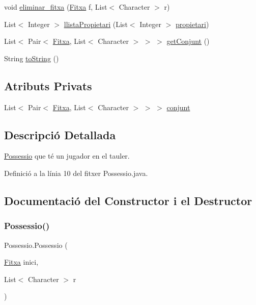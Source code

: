 \begin{DoxyCompactItemize}
\item 
void \mbox{\hyperlink{class_possessio_a2908495ca9acf15fb6c789e753a0eec8}{eliminar\+\_\+fitxa}} (\mbox{\hyperlink{class_fitxa}{Fitxa}} f, List$<$ Character $>$ r)
\item 
List$<$ Integer $>$ \mbox{\hyperlink{class_possessio_a9173269f71b9ac357c33e571f04c84c6}{llista\+Propietari}} (List$<$ Integer $>$ \mbox{\hyperlink{class_possessio_a514ceb05b8016e230eddbc7e3e43b325}{propietari}})
\item 
List$<$ Pair$<$ \mbox{\hyperlink{class_fitxa}{Fitxa}}, List$<$ Character $>$ $>$ $>$ \mbox{\hyperlink{class_possessio_a2e484840944b6f2c5a1fbe7219d39b9c}{get\+Conjunt}} ()
\item 
String \mbox{\hyperlink{class_possessio_a7e75c5f8c1bfa87d1f22049f1109f855}{to\+String}} ()
\end{DoxyCompactItemize}
\subsection*{Atributs Privats}
\begin{DoxyCompactItemize}
\item 
List$<$ Pair$<$ \mbox{\hyperlink{class_fitxa}{Fitxa}}, List$<$ Character $>$ $>$ $>$ \mbox{\hyperlink{class_possessio_a4af748d6da87a5f1b68dbff47d84c4a3}{conjunt}}
\end{DoxyCompactItemize}


\subsection{Descripció Detallada}
\mbox{\hyperlink{class_possessio}{Possessio}} que té un jugador en el tauler. 

Definició a la línia 10 del fitxer Possessio.\+java.



\subsection{Documentació del Constructor i el Destructor}
\mbox{\label{class_possessio_a192dc7a5276bc2d8f18b80c0061a5fe6}} 
\subsubsection{\texorpdfstring{Possessio()}{Possessio()}}
{\footnotesize\ttfamily Possessio.\+Possessio (\begin{DoxyParamCaption}\item[{\mbox{\hyperlink{class_fitxa}{Fitxa}}}]{inici,  }\item[{List$<$ Character $>$}]{r }\end{DoxyParamCaption})}

